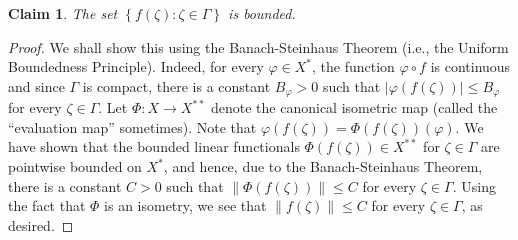 \documentclass[11pt]{article}
\theoremstyle{thmstyle}
\theoremstyle{defstyle}
\newtheorem*{claim}{Claim}
\renewcommand{\le}{\leqslant}
\begin{document}
\begin{claim}
    The set $\left\{f(\zeta)\colon\zeta\in\Gamma\right\}$ is bounded.
\end{claim}
\begin{proof}
    We shall show this using the Banach-Steinhaus Theorem (i.e., the Uniform Boundedness Principle). Indeed, for every $\varphi\in X^\ast$, the function $\varphi\circ f$ is continuous and since $\Gamma$ is compact, there is a constant $B_\varphi > 0$ such that $|\varphi(f(\zeta))|\le B_\varphi$ for every $\zeta\in\Gamma$. Let $\Phi\colon X\to X^{\ast\ast}$ denote the canonical isometric map (called the ``evaluation map'' sometimes). Note that $\varphi(f(\zeta)) = \Phi(f(\zeta))(\varphi)$. We have shown that the bounded linear functionals $\Phi(f(\zeta))\in X^{\ast\ast}$ for $\zeta\in\Gamma$ are pointwise bounded on $X^\ast$, and hence, due to the Banach-Steinhaus Theorem, there is a constant $C > 0$ such that $\|\Phi(f(\zeta))\|\le C$ for every $\zeta\in\Gamma$. Using the fact that $\Phi$ is an isometry, we see that $\|f(\zeta)\|\le C$ for every $\zeta\in\Gamma$, as desired.
\end{proof}
\end{document}
